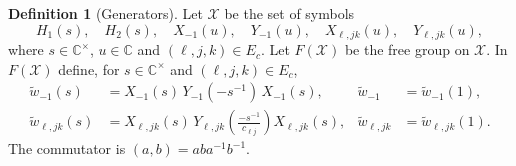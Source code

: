 \documentclass[11pt]{article}
\theoremstyle{definition}
\newtheorem{definition}[theorem]{Definition}
\theoremstyle{remark}
\newcommand{\wt}{\widetilde{w}}
\newcommand{\Cx}{\mathbb{C}^{\times}}
\begin{document}
\begin{definition}[Generators]
Let $\mathcal{X}$ be the set of symbols
\[
H_1(s),\quad H_2(s),\quad X_{-1}(u),\quad Y_{-1}(u),\quad X_{\ell,jk}(u),\quad Y_{\ell,jk}(u),
\]
where $s\in\Cx$, $u\in\mathbb{C}$ and $(\ell,j,k)\in E_c$. Let $F(\mathcal{X})$ be the free group on $\mathcal{X}$. In $F(\mathcal{X})$ define, for $s\in\Cx$ and $(\ell,j,k)\in E_c$,
\begin{align*}
\wt_{-1}(s)&=X_{-1}(s)\,Y_{-1}(-s^{-1})\,X_{-1}(s), & \wt_{-1}&=\wt_{-1}(1),\\
\wt_{\ell,jk}(s)&=X_{\ell,jk}(s)\,Y_{\ell,jk}\!\left(\tfrac{-s^{-1}}{c_{\ell j}}\right)X_{\ell,jk}(s), & \wt_{\ell,jk}&=\wt_{\ell,jk}(1).
\end{align*}
The commutator is $(a,b)=aba^{-1}b^{-1}$.
\end{definition}
\end{document}
